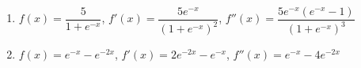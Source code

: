 \documentclass{ximera}
\begin{document}
\begin{enumerate}
\setcounter{enumi}{\value{HW}}

\item\label{exponentialcurvesketchfirst}  $f(x) = \dfrac{5}{1 + e^{-x}}$,  $f'(x) = \dfrac{5 e^{-x}}{\left(1 + e^{-x} \right)^2}$, $f''(x) = \dfrac{5e^{-x}\left(e^{-x}-1\right)}{\left(1+e^{-x}\right)^3}$

\smallskip

\item\label{exponentialcurvesketchlast}  $f(x) = e^{-x} - e^{-2x}$, $f'(x) = 2e^{-2x} - e^{-x}$, $f''(x) = e^{-x} - 4 e^{-2x}$


\setcounter{HW}{\value{enumi}}
\end{enumerate}
\end{document}
